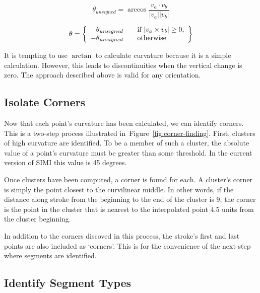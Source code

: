 \begin{samepage}
\begin{equation}
  \theta_{unsigned} = \arccos \frac{v_a\cdot v_b}{|v_a| |v_b|}
\end{equation}

\begin{equation}
  \theta = \left\{ 
  \begin{array}{r l}
    \theta_{unsigned} & \quad \text{if } |v_a \times v_b| \geq 0\text{,}\\
    -\theta_{unsigned} & \quad \text{otherwise}\\
  \end{array} \right\}
\end{equation}
\begin{samepage}

It is tempting to use $\arctan$ to calculate curvature because it is a
simple calculation. However, this leads to discontinuities when the
vertical change is zero. The approach described above is valid for any
orientation.

\subsection{Isolate Corners}

Now that each point's curvature has been calculated, we can identify
corners. This is a two-step process illustrated
in~Figure~\ref{fig:corner-finding}. First, clusters of high curvature
are identified. To be a member of such a cluster, the absolute value
of a point's curvature must be greater than some threshold. In the
current version of SIMI this value is 45 degrees.



Once clusters have been computed, a corner is found for each. A
cluster's corner is simply the point closest to the curvilinear
middle. In other words, if the distance along stroke from the
beginning to the end of the cluster is 9, the corner is the point in
the cluster that is nearest to the interpolated point 4.5 units from
the cluster beginning. 

In addition to the corners discoved in this process, the stroke's
first and last points are also included as `corners'. This is for the
convenience of the next step where segments are identified.

\subsection{Identify Segment Types}


\end{samepage}
\end{samepage}
